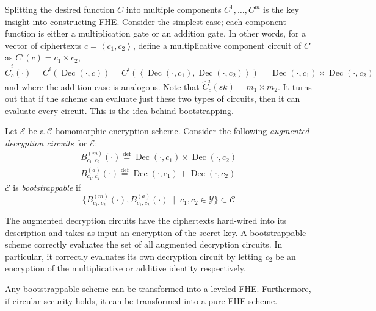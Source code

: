 Splitting the desired function $C$ into multiple components $C^1, \dots, C^m$ is the key insight into constructing FHE. Consider the simplest case; each component function is either a multiplication gate or an addition gate. In other words, for a vector of ciphertexts $c = \left\langle c_1, c_2 \right\rangle$, define a multiplicative component circuit of $C$ as $C^i(c) = c_1 \times c_2$, $\hat{C}^i_c(\cdot) = C^i(\operatorname{Dec}(\cdot, c)) = C^i(\left\langle \operatorname{Dec}(\cdot, c_1), \operatorname{Dec}(\cdot, c_2) \right\rangle) = \operatorname{Dec}(\cdot, c_1) \times \operatorname{Dec}(\cdot, c_2)$ and where the addition case is analogous. Note that $\hat{C}^i_c(sk) = m_1 \times m_2$. It turns out that if the scheme can evaluate just these two types of circuits, then it can evaluate every circuit. This is the idea behind bootstrapping.
\begin{definition}
    \label{def:bootstrappable}
    Let $\mathcal{E}$ be a $\mathcal{C}$-homomorphic encryption scheme. Consider the following \emph{augmented decryption circuits} for $\mathcal{E}$:
    \begin{equation*}
    \begin{aligned}        
        B_{c_1,c_2}^{(m)}(\cdot) \stackrel{\mathrm{def}}{=} \operatorname{Dec}(\cdot, c_1) \times \operatorname{Dec}(\cdot, c_2)\\
        B_{c_1,c_2}^{(a)}(\cdot) \stackrel{\mathrm{def}}{=} \operatorname{Dec}(\cdot, c_1) + \operatorname{Dec}(\cdot, c_2)
    \end{aligned}
    \end{equation*}
    $\mathcal{E}$ is \emph{bootstrappable} if
    \begin{equation*}
    \{B_{c_1,c_2}^{(m)}(\cdot), B_{c_1,c_2}^{(a)}(\cdot) \; \mid \; c_1, c_2 \in \mathcal{Y}\} \subset \mathcal{C}
    \end{equation*}
\end{definition}
The augmented decryption circuits have the ciphertexts hard-wired into its description and takes as input an encryption of the secret key. A bootstrappable scheme correctly evaluates the set of all augmented decryption circuits. In particular, it correctly evaluates its own decryption circuit by letting $c_2$ be an encryption of the multiplicative or additive identity respectively.
\begin{theorem} \label{thm:bootstrapping}
Any bootstrappable scheme can be transformed into a leveled FHE. Furthermore, if circular security holds, it can be transformed into a pure FHE scheme.
\end{theorem}

